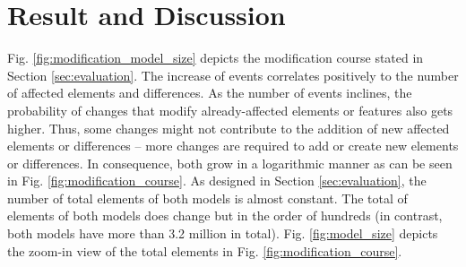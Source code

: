 \documentclass{llncs}
\begin{document}
\section{Result and Discussion}
\label{sec:discussion}

Fig. \ref{fig:modification_model_size} depicts the modification course stated in Section \ref{sec:evaluation}. The increase of events correlates positively to the number of affected elements and differences. As the number of events inclines, the probability of changes that modify already-affected elements or features also gets higher. Thus, some changes might not contribute to the addition of new affected elements or differences -- more changes are required to add or create new elements or differences. In consequence, both grow in a logarithmic manner as can be seen in Fig. \ref{fig:modification_course}. As designed in Section \ref{sec:evaluation}, the number of total elements of both models is almost constant. The total of elements of both models does change but in the order of hundreds (in contrast, both models have more than 3.2 million in total). Fig. \ref{fig:model_size} depicts the zoom-in view of the total elements in Fig. \ref{fig:modification_course}.
\end{document}
